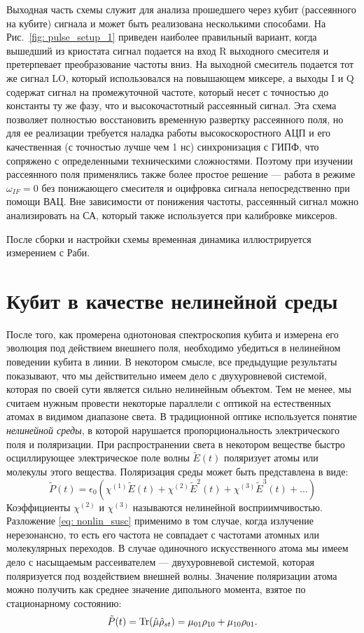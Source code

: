 Выходная часть схемы служит для анализа прошедшего через кубит (рассеянного на кубите) сигнала и может быть реализована несколькими способами. На Рис.~\ref{fig: pulse_setup_1} приведен наиболее правильный вариант, когда вышедший из криостата сигнал подается на вход R выходного смесителя и  претерпевает преобразование частоты вниз. На выходной смеситель подается тот же сигнал LO, который использовался на повышающем миксере, а выходы I и Q содержат сигнал на промежуточной частоте, который несет с точностью до константы ту же фазу, что и высокочастотный рассеянный сигнал. Эта схема позволяет полностью восстановить временную развертку рассеянного поля, но для ее реализации требуется наладка работы высокоскоростного АЦП и его качественная (с точностью лучше чем 1 нс) синхронизация с ГИПФ, что сопряжено с определенными техническими сложностями. Поэтому при изучении рассеянного поля применялись также более простое решение --- работа в режиме $\omega_{IF}=0$ без понижающего смесителя и оцифровка сигнала непосредственно при помощи ВАЦ. Вне зависимости от понижения частоты, рассеянный сигнал можно анализировать на СА, который также используется при калибровке миксеров.

После сборки и настройки схемы временная динамика иллюстрируется измерением с Раби.
\section{Кубит в качестве нелинейной среды}
После того, как промерена однотоновая спектроскопия кубита и измерена его эволюция под действием внешнего поля, необходимо убедиться в нелинейном поведении кубита в линии. В некотором смысле, все предыдущие результаты показывают, что мы действительно имеем дело с двухуровневой системой, которая по своей сути является сильно нелинейным объектом. Тем не менее, мы считаем нужным провести некоторые параллели с оптикой на естественных атомах в видимом диапазоне света. В традиционной оптике используется понятие \textit{нелинейной среды}, в которой нарушается пропорциональность электрического поля и поляризации. При распространении света в некотором веществе быстро осциллирующее электрическое поле волны $\tilde{E}(t)$ поляризует атомы или молекулы этого вещества. Поляризация среды может быть представлена в виде:
\begin{equation}
\tilde{P}(t) = \epsilon_0\left(\chi^{(1)}\tilde{E}(t) + \chi^{(2)}\tilde{E}^2(t) + \chi^{(3)}\tilde{E}^3(t) + \ldots\right)
\label{eq: nonlin_susc}
\end{equation}
Коэффициенты $\chi^{(2)}$ и $\chi^{(3)}$ называются нелинейной восприимчивостью. Разложение \eqref{eq: nonlin_susc} применимо в том случае, когда излучение нерезонансно, то есть его частота не совпадает с частотами атомных или молекулярных переходов. В случае одиночного искусственного атома мы имеем дело с насыщаемым рассеивателем --- двухуровневой системой, которая поляризуется под воздействием внешней волны. Значение поляризации атома можно получить как среднее значение дипольного момента, взятое по стационарному состоянию:
\begin{equation}
\tilde{P}(t) = \operatorname{Tr}(\hat{\mu}\hat{\rho}_{st}) = \mu_{01}\rho_{10} + \mu_{10}\rho_{01}.
\end{equation}

